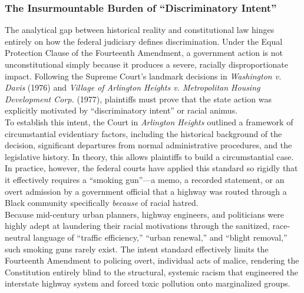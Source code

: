 \documentclass[
]{article}
\begin{document}
\subsubsection{\texorpdfstring{\textbf{The Insurmountable Burden of
``Discriminatory
Intent''}}{The Insurmountable Burden of ``Discriminatory Intent''}}\label{the-insurmountable-burden-of-discriminatory-intent}

The analytical gap between historical reality and constitutional law
hinges entirely on how the federal judiciary defines discrimination.
Under the Equal Protection Clause of the Fourteenth Amendment, a
government action is not unconstitutional simply because it produces a
severe, racially disproportionate impact. Following the Supreme Court's
landmark decisions in \emph{Washington v. Davis} (1976) and
\emph{Village of Arlington Heights v. Metropolitan Housing Development
Corp.} (1977), plaintiffs must prove that the state action was
explicitly motivated by ``discriminatory intent'' or racial animus.\\
To establish this intent, the Court in \emph{Arlington Heights} outlined
a framework of circumstantial evidentiary factors, including the
historical background of the decision, significant departures from
normal administrative procedures, and the legislative history. In
theory, this allows plaintiffs to build a circumstantial case. In
practice, however, the federal courts have applied this standard so
rigidly that it effectively requires a ``smoking gun''---a memo, a
recorded statement, or an overt admission by a government official that
a highway was routed through a Black community specifically
\emph{because} of racial hatred.\\
Because mid-century urban planners, highway engineers, and politicians
were highly adept at laundering their racial motivations through the
sanitized, race-neutral language of ``traffic efficiency,'' ``urban
renewal,'' and ``blight removal,'' such smoking guns rarely exist. The
intent standard effectively limits the Fourteenth Amendment to policing
overt, individual acts of malice, rendering the Constitution entirely
blind to the structural, systemic racism that engineered the interstate
highway system and forced toxic pollution onto marginalized groups.
\end{document}
